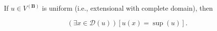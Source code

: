 If $u \in V^{(\mathbf{B})}$ is uniform (i.e., extensional with complete domain), then

$$(\exists x \in \mathcal{D}(u))[u(x) = \sup(u)].$$
